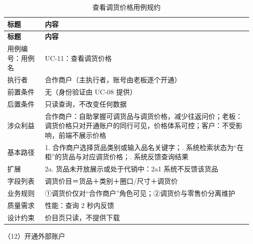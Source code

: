 {\small
\begin{longtable}{@{}L{3.0cm} L{12.3cm}@{}}
\caption{查看调货价格用例规约}\label{tab:uc-11}\\
\toprule
\textbf{标题} & \textbf{内容} \\
\midrule
\endfirsthead
\toprule
\textbf{标题} & \textbf{内容} \\
\midrule
\endhead
用例编号：用例名 & UC-11：查看调货价格 \\
\midrule
执行者 & 合作商户（主执行者，账号由老板逐个开通） \\
\midrule
前置条件 & 无（身份验证由 UC-08 提供） \\
\midrule
后置条件 & 只读查询，不改变任何数据 \\
\midrule
涉众利益 & 合作商户：自助掌握可调货品与调货价格，减少往返问价；\newline 老板：调货价格只对开通账户的同行可见，价格体系可控；\newline 客户：不受影响，前端不展示价格 \\
\midrule
基本路径 & 1. 合作商户选择货品类别或输入品名关键字；. 系统检索状态为“在柜”的货品与对应调货价格；. 系统反馈查询结果 \\
\midrule
扩展 & 2a. 货品未开放展示或处于代销中：2a1 系统不反馈该货品 \\
\midrule
字段列表 & 调货价目＝货品＋类别＋圈口/尺寸＋调货价 \\
\midrule
业务规则 & ①调货价仅对“合作商户”角色可见；\newline ②调货价与零售价分离维护 \\
\midrule
质量需求 & 性能：查询 2 秒内反馈 \\
\midrule
设计约束 & 价目页只读，不提供下载 \\
\midrule
\bottomrule
\end{longtable}}
\noindent（12）开通外部账户

